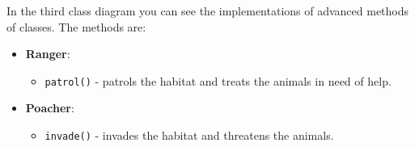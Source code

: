 \documentclass[a4paper,12pt]{article}
\begin{document}
In the third class diagram you can see the implementations of advanced methods of classes.
The methods are:
\begin{itemize}
    \item \textbf{Ranger}:
    \begin{itemize}
        \item \texttt{patrol()} - patrols the habitat and treats the animals in need of help.
    \end{itemize}
    \item \textbf{Poacher}:
    \begin{itemize}
        \item \texttt{invade()} - invades the habitat and threatens the animals.
    \end{itemize}

\end{itemize}
\end{document}
